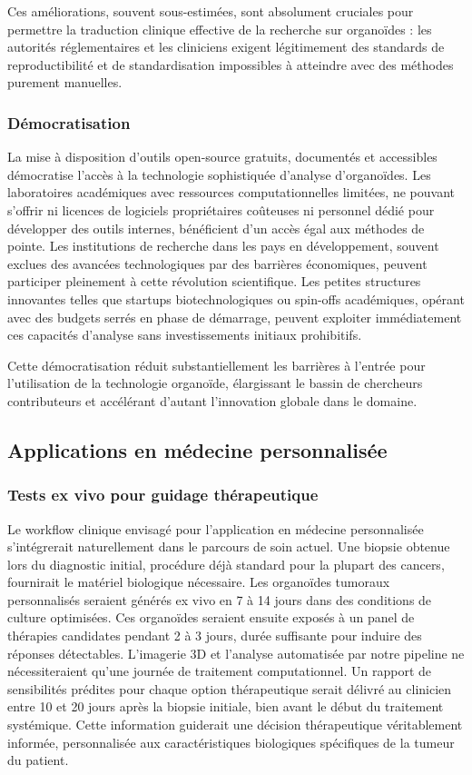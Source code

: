 Ces améliorations, souvent sous-estimées, sont absolument cruciales pour permettre la traduction clinique effective de la recherche sur organoïdes : les autorités réglementaires et les cliniciens exigent légitimement des standards de reproductibilité et de standardisation impossibles à atteindre avec des méthodes purement manuelles.

\subsubsection{Démocratisation}

La mise à disposition d'outils open-source gratuits, documentés et accessibles démocratise l'accès à la technologie sophistiquée d'analyse d'organoïdes. Les laboratoires académiques avec ressources computationnelles limitées, ne pouvant s'offrir ni licences de logiciels propriétaires coûteuses ni personnel dédié pour développer des outils internes, bénéficient d'un accès égal aux méthodes de pointe. Les institutions de recherche dans les pays en développement, souvent exclues des avancées technologiques par des barrières économiques, peuvent participer pleinement à cette révolution scientifique. Les petites structures innovantes telles que startups biotechnologiques ou spin-offs académiques, opérant avec des budgets serrés en phase de démarrage, peuvent exploiter immédiatement ces capacités d'analyse sans investissements initiaux prohibitifs.

Cette démocratisation réduit substantiellement les barrières à l'entrée pour l'utilisation de la technologie organoïde, élargissant le bassin de chercheurs contributeurs et accélérant d'autant l'innovation globale dans le domaine.

\subsection{Applications en médecine personnalisée}

\subsubsection{Tests ex vivo pour guidage thérapeutique}

Le workflow clinique envisagé pour l'application en médecine personnalisée s'intégrerait naturellement dans le parcours de soin actuel. Une biopsie obtenue lors du diagnostic initial, procédure déjà standard pour la plupart des cancers, fournirait le matériel biologique nécessaire. Les organoïdes tumoraux personnalisés seraient générés ex vivo en 7 à 14 jours dans des conditions de culture optimisées. Ces organoïdes seraient ensuite exposés à un panel de thérapies candidates pendant 2 à 3 jours, durée suffisante pour induire des réponses détectables. L'imagerie 3D et l'analyse automatisée par notre pipeline ne nécessiteraient qu'une journée de traitement computationnel. Un rapport de sensibilités prédites pour chaque option thérapeutique serait délivré au clinicien entre 10 et 20 jours après la biopsie initiale, bien avant le début du traitement systémique. Cette information guiderait une décision thérapeutique véritablement informée, personnalisée aux caractéristiques biologiques spécifiques de la tumeur du patient.

